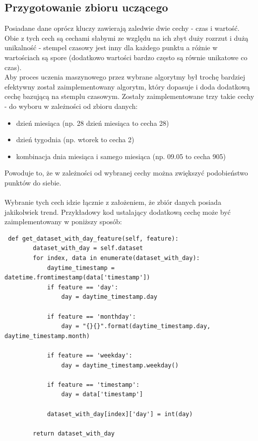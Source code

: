 \documentclass[eng,printmode]{mgr}
\begin{document}
\subsection{Przygotowanie zbioru uczącego}
Posiadane dane oprócz kluczy zawierają zaledwie dwie cechy - czas i wartość. Obie z tych cech są cechami słabymi ze względu na ich zbyt duży rozrzut i dużą unikalność - stempel czasowy jest inny dla każdego punktu a różnie w wartościach są spore (dodatkowo wartości bardzo często są równie unikatowe co czas). \\
Aby proces uczenia maszynowego przez wybrane algorytmy był trochę bardziej efektywny został zaimplementowany algorytm, który dopasuje i doda dodatkową cechę bazującą na stemplu czasowym. Zostały zaimplementowane trzy takie cechy - do wyboru w zależności od zbioru danych:
\begin{itemize}
	\item dzień miesiąca (np. 28 dzień miesiąca to cecha 28)
	\item dzień tygodnia (np. wtorek to cecha 2)
	\item kombinacja dnia miesiąca i samego miesiąca (np. 09.05 to cecha 905)
\end{itemize}
Powoduje to, że w zależności od wybranej cechy można zwiększyć podobieństwo punktów do siebie. 
\\\\
Wybranie tych cech idzie łącznie z założeniem, że zbiór danych posiada jakikolwiek trend. Przykładowy kod ustalający dodatkową cechę może być zaimplementowany w poniższy sposób:
\\
\begin{lstlisting}
 def get_dataset_with_day_feature(self, feature):
        dataset_with_day = self.dataset
        for index, data in enumerate(dataset_with_day):
            daytime_timestamp = datetime.fromtimestamp(data['timestamp'])
            if feature == 'day':
                day = daytime_timestamp.day

            if feature == 'monthday':
                day = "{}{}".format(daytime_timestamp.day, daytime_timestamp.month)

            if feature == 'weekday':
                day = daytime_timestamp.weekday()

            if feature == 'timestamp':
                day = data['timestamp']

            dataset_with_day[index]['day'] = int(day)

        return dataset_with_day
\end{lstlisting}
\end{document}
